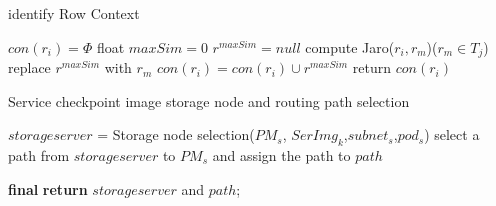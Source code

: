 \documentclass[11pt]{article}
\begin{document}
  
	
 \begin{algorithm}  
 	\caption{identify Row Context}  
 	$con(r_i)= \Phi$\;  
 	{  
 		float $maxSim=0$\;  
 		$r^{maxSim}=null$\;  
 		{  
 			compute Jaro($r_i,r_m$)($r_m\in T_j$)\;  
 			{  
 				replace $r^{maxSim}$ with $r_m$\;  
 			}  
 		}  
 		$con(r_i)=con(r_i)\cup {r^{maxSim}}$\;  
 	}  
 	return $con(r_i)$\;  
 \end{algorithm} 

 
 
 \begin{algorithm}  
 	\caption{Service checkpoint image storage node and routing path selection}  
 	\LinesNumbered  
 	$storageserver$ = Storage node selection($PM_s$, $SerImg_k$,$subnet_s$,$pod_s$)\;  
 	{  
 		select a path from $storageserver$ to $PM_s$ and assign the path to $path$\;  
 	}  
 	
 	\textbf{final} \;  
 	\textbf{return} $storageserver$ and $path$;  
 	
 \end{algorithm}
 

\end{document}
